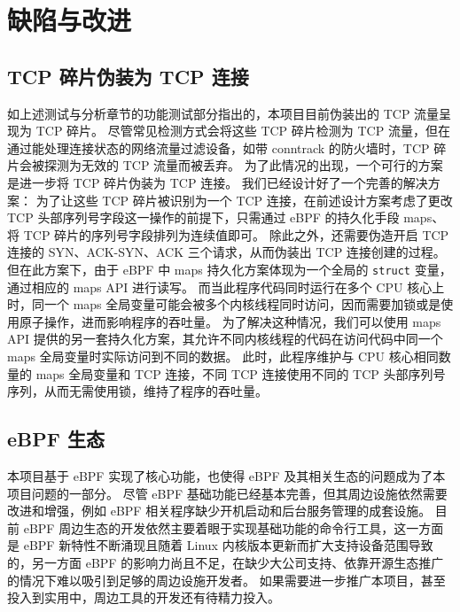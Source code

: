 

\chapter{缺陷与改进}

\section{TCP 碎片伪装为 TCP 连接}

如上述测试与分析章节的功能测试部分指出的，本项目目前伪装出的 TCP 流量呈现为 TCP 碎片。
尽管常见检测方式会将这些 TCP 碎片检测为 TCP 流量，但在通过能处理连接状态的网络流量过滤设备，如带 conntrack 的防火墙时，TCP 碎片会被探测为无效的 TCP 流量而被丢弃。
为了此情况的出现，一个可行的方案是进一步将 TCP 碎片伪装为 TCP 连接。
我们已经设计好了一个完善的解决方案：
为了让这些 TCP 碎片被识别为一个 TCP 连接，在前述设计方案考虑了更改 TCP 头部序列号字段这一操作的前提下，只需通过 eBPF 的持久化手段 maps、将 TCP 碎片的序列号字段排列为连续值即可。
除此之外，还需要伪造开启 TCP 连接的 SYN、ACK-SYN、ACK 三个请求，从而伪装出 TCP 连接创建的过程。
但在此方案下，由于 eBPF 中 maps 持久化方案体现为一个全局的 \texttt{struct} 变量，通过相应的 maps API 进行读写。
而当此程序代码同时运行在多个 CPU 核心上时，同一个 maps 全局变量可能会被多个内核线程同时访问，因而需要加锁或是使用原子操作，进而影响程序的吞吐量。
为了解决这种情况，我们可以使用 maps API 提供的另一套持久化方案，其允许不同内核线程的代码在访问代码中同一个 maps 全局变量时实际访问到不同的数据。
此时，此程序维护与 CPU 核心相同数量的 maps 全局变量和 TCP 连接，不同 TCP 连接使用不同的 TCP 头部序列号序列，从而无需使用锁，维持了程序的吞吐量。

\section{eBPF 生态}

本项目基于 eBPF 实现了核心功能，也使得 eBPF 及其相关生态的问题成为了本项目问题的一部分。
尽管 eBPF 基础功能已经基本完善，但其周边设施依然需要改进和增强，例如 eBPF 相关程序缺少开机启动和后台服务管理的成套设施。
目前 eBPF 周边生态的开发依然主要着眼于实现基础功能的命令行工具，这一方面是 eBPF 新特性不断涌现且随着 Linux 内核版本更新而扩大支持设备范围导致的，另一方面 eBPF 的影响力尚且不足，在缺少大公司支持、依靠开源生态推广的情况下难以吸引到足够的周边设施开发者。
如果需要进一步推广本项目，甚至投入到实用中，周边工具的开发还有待精力投入。
